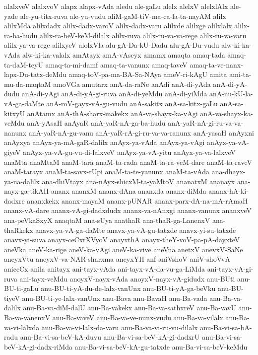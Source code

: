 {alalxveV
alalxvoV
alapx
alapx-vAda
aledu
ale-gaLu
alelx
alelxV
alelxlAlx
ale-yade
ale-yu-titx-ruva
ale-yu-vudu
aliM-gaM-tiV-ma-ca-la-ta-nayAM
alilx
alilxMda
alilxdadx
alilx-dadx-varoV
alilx-dadx-varu
alilxde
alilxge
alilxlalx
alilx-ra-ba-hudu
alilx-ra-beV-keM-dilalx
alilx-ruva
alilx-ru-va-va-rege
alilx-ru-va-varu
alilx-ya-va-rege
alilxyeV
alolxVla
alu-gA-Da-kU-Dadu
alu-gA-Du-vudu
alw-ki-ka-vAda
alw-ki-ka-valalx
amAtayx
amA-vAseyx
amamx
amaqta
amaq-tada
amaq-ta-daM-teyU
amaq-ta-mi-damf
amaq-ta-vanunx
amaq-taveV
amaq-ta-ve-nanx-lapx-Du-tatx-deMdu
amaq-toV-pa-ma-BA-Sa-NAya
ameV-ri-kAgU
amita
ami-ta-mu-da-maqtaM
amoVGa
amutarx
anA-da-raNe
anAdi
anA-di-yAda
anA-di-yA-dudu
anA-di-yAgi
anA-di-yA-gi-ruva
anA-di-yeMdu
anA-di-yiMda
anA-nu-kU-la-vA-ga-daMte
anA-roV-gayx-vA-gu-vudu
anA-sakitx
anA-sa-kitx-gaLu
anA-sa-kitxyU
anAtamx
anA-thA-sharx-makekx
anA-va-shayx-ka-vAgi
anA-va-shayx-ka-veMdu
anA-yAsaH
anAyaR
anA-yaR-nA-ga-ba-hudu
anA-yaR-nA-gi-ru-va-va-nanunx
anA-yaR-nA-gu-vanu
anA-yaR-rA-gi-ru-va-va-ranunx
anA-yasaH
anAyxni
anAyxya
anAyx-ya-mA-gaR-dalilx
anAyx-ya-vAda
anAyx-ya-vAgi
anAyx-ya-vA-giyeV
anAyx-ya-vA-gu-vu-di-lalxveV
anAyx-ya-vA-yitu
anAyx-ya-va-lalxveV
anaMta
anaMtaM
anaM-tara
anaM-ta-rada
anaM-ta-ra-veM-dare
anaM-ta-raveV
anaM-tarayx
anaM-ta-savx-rUpi
anaM-ta-te-yanunx
anaM-ta-vAda
ana-dhayx-ya-na-dalilx
ana-dhiVtayx
ana-nAyx-shicxM-ta-yaMtoV
ananatxM
ananayx
ana-nayx-ga-tikAH
ananx
ananxM
ananx-dAna
ananxda
ananx-diMda
ananx-hA-ki-dadxre
ananxkekx
ananx-mayaM
ananx-pUNAR
ananx-parx-dA-na-mA-rAmaH
ananx-vA-dare
ananx-vA-gi-dadxdudx
ananx-va-nAnxgi
ananx-vanunx
ananxveV
ana-peVkaSxyX
anaqtaM
ana-sUya
anathaR
ana-thaR-ga-LanenxV
ana-thaRkekx
anavx-ya-vA-ga-daMte
anavx-ya-vA-gu-tatxde
anavx-yi-su-tatxde
anavx-yi-suva
anayx-ceCxrXVyoV
anayxthA
anayx-theY-voV-pa-pA-dayxteV
aneVka
aneV-ka-rige
aneV-ka-vAgi
aneV-ka-vive
aneVna
anetxV
anevxV-SaNe
aneyxVtu
aneyxV-va-NAR-sharxma
aneyxYH
anf
aniVshoV
aniV-shoVvA
aniceCx
anila
anitayx
ani-tayx-vAda
ani-tayx-vA-da-vu-ga-LiMda
ani-tayx-vA-gi-ruva
ani-tayx-veMdu
anoyxV-nayx-vAda
anoyxV-nayx-vA-gidudx
anu-BUti
anu-BU-ti-gaLu
anu-BU-ti-yA-du-de-lalx-vanUnx
anu-BU-ti-yA-ga-beVku
anu-BU-tiyeV
anu-BU-ti-ye-lalx-vanUnx
anu-Bava
anu-BavaH
anu-Ba-vada
anu-Ba-va-dalilx
anu-Ba-va-diM-dalU
anu-Ba-vakekx
anu-Ba-va-sathxreV
anu-Ba-vavU
anu-Ba-va-vanenxV
anu-Ba-vaveV
anu-Ba-va-ve-nunx-vudu
anu-Ba-va-vilalx
anu-Ba-va-vi-lalxda
anu-Ba-va-vi-lalx-da-varu
anu-Ba-va-vi-ru-vu-dilalx
anu-Ba-vi-sa-bA-radu
anu-Ba-vi-sa-beV-kA-duvu
anu-Ba-vi-sa-beV-kA-gi-dadxrU
anu-Ba-vi-sa-beV-kA-gi-dadx-riMda
anu-Ba-vi-sa-beV-kA-gu-tatxde
anu-Ba-vi-sa-beV-keMdu
}
